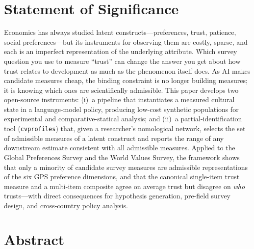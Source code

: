 \documentclass[11pt,letterpaper]{article}
\begin{document}
\vspace{0.4em}

\section*{Statement of Significance}

Economics has always studied latent constructs---preferences, trust, patience, social preferences---but its instruments for observing them are costly, sparse, and each is an imperfect representation of the underlying attribute. Which survey question you use to measure ``trust'' can change the answer you get about how trust relates to development as much as the phenomenon itself does. As AI makes candidate measures cheap, the binding constraint is no longer building measures; it is knowing which ones are scientifically admissible. This paper develops two open-source instruments: (i)~a pipeline that instantiates a measured cultural state in a language-model policy, producing low-cost synthetic populations for experimental and comparative-statical analysis; and (ii)~a partial-identification tool (\texttt{cvprofiles}) that, given a researcher's nomological network, selects the set of admissible measures of a latent construct and reports the range of any downstream estimate consistent with all admissible measures. Applied to the Global Preferences Survey and the World Values Survey, the framework shows that only a minority of candidate survey measures are admissible representations of the six GPS preference dimensions, and that the canonical single-item trust measure and a multi-item composite agree on average trust but disagree on \emph{who} trusts---with direct consequences for hypothesis generation, pre-field survey design, and cross-country policy analysis.

\vspace{0.4em}

\section*{Abstract}
\end{document}

